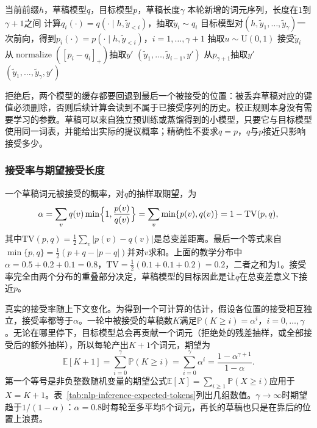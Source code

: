 \begin{algorithm}[推测采样的一轮]
  \label{alg:nlp-inference-speculative}
  \begin{algorithmic}[1]
    \Require 当前前缀$h$，草稿模型$q$，目标模型$p$，草稿长度$\gamma$
    \Ensure 本轮新增的词元序列，长度在$1$到$\gamma+1$之间
      \State 计算$q_i(\cdot)=q(\cdot\mid h,\tilde y_{<i})$，抽取$\tilde y_i\sim q_i$
    \EndFor
    \State 目标模型对$(h,\tilde y_1,\ldots,\tilde y_\gamma)$一次前向，得到$p_i(\cdot)=p(\cdot\mid h,\tilde y_{<i})$，$i=1,\ldots,\gamma+1$
      \State 抽取$u\sim\mathrm U(0,1)$
        \State 接受$\tilde y_i$
      \Else
        \State 从$\operatorname{normalize}([p_i-q_i]_+)$抽取$y'$
        \State \Return $(\tilde y_1,\ldots,\tilde y_{i-1},y')$
      \EndIf
    \EndFor
    \State 从$p_{\gamma+1}$抽取$y'$
    \State \Return $(\tilde y_1,\ldots,\tilde y_\gamma,y')$
  \end{algorithmic}
\end{algorithm}

拒绝后，两个模型的缓存都要回退到最后一个被接受的位置：被丢弃草稿对应的键值必须删除，否则后续计算会读到不属于已接受序列的历史。校正规则本身没有需要学习的参数。草稿可以来自独立预训练或蒸馏得到的小模型，只要它与目标模型使用同一词表，并能给出实际的提议概率；精确性不要求$q=p$，$q$与$p$接近只影响接受多少。

\subsubsection{接受率与期望接受长度}
\label{sec:nlp-inference-spec-acceptance}

一个草稿词元被接受的概率，对$q$的抽样取期望，为
\begin{equation}
 \alpha=\sum_vq(v)\min\Bigl\{1,\frac{p(v)}{q(v)}\Bigr\}=\sum_v\min\{p(v),q(v)\}=1-\mathrm{TV}(p,q),
 \label{eq:nlp-inference-acceptance-rate}
\end{equation}
其中$\mathrm{TV}(p,q)=\frac12\sum_v|p(v)-q(v)|$是总变差距离。最后一个等式来自$\min\{p,q\}=\frac12(p+q-|p-q|)$并对$v$求和。上面的教学分布中$\alpha=0.5+0.2+0.1=0.8$，$\mathrm{TV}=\frac12(0.1+0.1+0.2)=0.2$，二者之和为1。接受率完全由两个分布的重叠部分决定，草稿模型的目标因此是让$q$在总变差意义下接近$p$。

真实的接受率随上下文变化。为得到一个可计算的估计，假设各位置的接受相互独立，接受率都等于$\alpha$。一轮中被接受的草稿数$K$满足$\mathbb P(K\geq i)=\alpha^i$，$i=0,\ldots,\gamma$。无论在哪里停下，目标模型总会再贡献一个词元（拒绝处的残差抽样，或全部接受后的额外抽样），所以每轮产出$K+1$个词元，期望为
\begin{equation}
 \mathbb E[K+1]=\sum_{i=0}^{\gamma}\mathbb P(K\geq i)=\sum_{i=0}^{\gamma}\alpha^i=\frac{1-\alpha^{\gamma+1}}{1-\alpha}.
 \label{eq:nlp-inference-expected-tokens}
\end{equation}
第一个等号是非负整数随机变量的期望公式$\mathbb E[X]=\sum_{i\geq1}\mathbb P(X\geq i)$应用于$X=K+1$。表~\ref{tab:nlp-inference-expected-tokens}列出几组数值。$\gamma\to\infty$时期望趋于$1/(1-\alpha)$：$\alpha=0.8$时每轮至多平均5个词元，再长的草稿也只是在靠后的位置上浪费。

